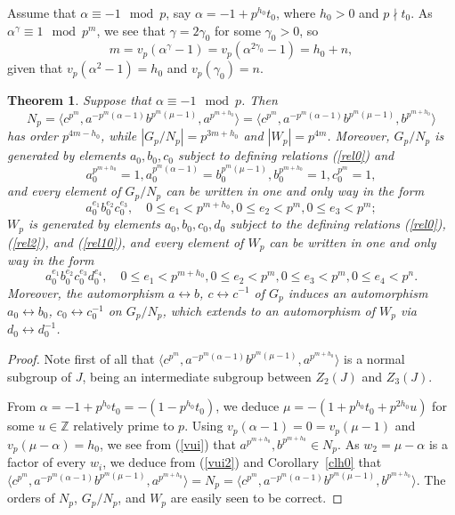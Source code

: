 \documentclass{amsart}
\newtheorem{theorem}{Theorem}[section]
\theoremstyle{definition}
\theoremstyle{remark}
\newcommand \Z{{\mathbb Z}}
\begin{document}
Assume that $\alpha\equiv -1\mod p$, say $\alpha=-1+p^{h_0} t_0$,
where $h_0>0$ and $p\nmid t_0$. As $\alpha^\gamma\equiv 1\mod p^m$, we see that $\gamma=2\gamma_0$
for some $\gamma_0>0$, so
$$
m=v_p(\alpha^\gamma-1)=v_p(\alpha^{2\gamma_0}-1)=h_0+n,
$$
given that $v_p(\alpha^2-1)=h_0$ and $v_p(\gamma_0)=n$. 

\begin{theorem}\label{hzero2} Suppose that $\alpha\equiv -1\mod p$. Then
$$
N_p=\langle c^{p^m}, a^{-p^m(\alpha-1)} b^{p^m(\mu-1)}, a^{p^{m+h_0}}\rangle=
\langle c^{p^m}, a^{-p^m(\alpha-1)} b^{p^m(\mu-1)}, b^{p^{m+h_0}}\rangle
$$
has order $p^{4m-h_0}$, while $|G_p/N_p|=p^{3m+h_0}$ and $|W_p|=p^{4m}$. Moreover,
$G_p/N_p$ is generated by elements $a_0,b_0,c_0$ subject to defining relations (\ref{rel0}) and
\begin{equation}
\label{rel10}
a_0^{p^{m+h_0}}=1, a_0^{p^{m}(\alpha-1)}=b_0^{p^{m}(\mu-1)}, b_0^{p^{m+h_0}}=1, c_0^{p^{m}}=1,
\end{equation}
and every element of $G_p/N_p$ can be written in one and only way in the form
$$
a_0^{e_1} b_0^{e_2}c_0^{e_3},\quad 0\leq e_1<p^{m+h_0}, 0\leq e_2<p^{m}, 0\leq e_3<p^{m};
$$
$W_p$ is generated by elements $a_0,b_0,c_0,d_0$ subject to the defining relations (\ref{rel0}), (\ref{rel2}),
and (\ref{rel10}), and every element of $W_p$ can be written in one and only way in the form
$$
a_0^{e_1} b_0^{e_2}c_0^{e_3}d_0^{e_4},\quad 0\leq e_1<p^{m+h_0}, 0\leq e_2<p^{m}, 0\leq e_3<p^{m}, 0\leq e_4<p^{n}.
$$
Moreover, the automorphism $a\leftrightarrow b$, $c\leftrightarrow c^{-1}$ of $G_p$ induces an automorphism $a_0\leftrightarrow b_0$, 
$c_0\leftrightarrow c_0^{-1}$ on $G_p/N_p$, which extends to an automorphism of $W_p$ via $d_0\leftrightarrow d_0^{-1}$.
\end{theorem}



\begin{proof} Note first of all that $\langle c^{p^m}, a^{-p^m(\alpha-1)} b^{p^m(\mu-1)}, a^{p^{m+h_0}}\rangle$
is a normal subgroup of $J$, being an intermediate subgroup between $Z_2(J)$ and $Z_3(J)$. %

From $\alpha=-1+p^{h_0} t_0=- (1-p^{h_0} t_0)$, we deduce $\mu=-(1+p^{h_0}t_0+p^{2h_0} u)$ for some $u\in\Z$ relatively
prime to $p$. Using $v_p(\alpha-1)=0=v_p(\mu-1)$ and $v_p(\mu-\alpha)=h_0$, we see from (\ref{vui}) that
$a^{p^{m+h_0}},b^{p^{m+h_0}}\in N_p$. As $w_2=\mu-\alpha$ is a factor of every $w_i$, we deduce from (\ref{vui2})
and Corollary~\ref{clh0} that $\langle c^{p^m}, a^{-p^m(\alpha-1)} b^{p^m(\mu-1)}, a^{p^{m+h_0}}\rangle=N_p=
\langle c^{p^m}, a^{-p^m(\alpha-1)} b^{p^m(\mu-1)}, b^{p^{m+h_0}}\rangle$. 
The orders of $N_p$, $G_p/N_p$, and $W_p$ are easily seen to be correct.
\end{proof}
\end{document}
